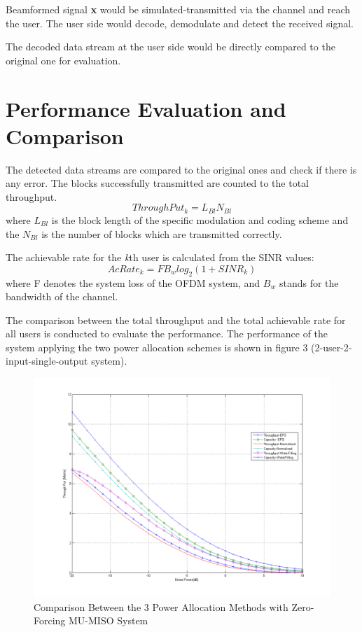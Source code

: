 \documentclass{article}
\begin{document}
\noindent
Beamformed signal \textbf{x} would be simulated-transmitted via the channel and reach the user.
The user side would decode, demodulate and detect the received signal.

\noindent
The decoded data stream at the user side would be directly compared to the original one for evaluation.


\section{Performance Evaluation and Comparison}
The detected data streams are compared to the original ones and check if there is any error. The blocks successfully transmitted are counted to the total throughput.
\[ThroughPut_k = L_{Bl}N_{Bl}\]
where $L_{Bl}$ is the block length of the specific modulation and coding scheme and the $N_{Bl}$ is the number of blocks which are transmitted correctly.

\noindent
The achievable rate for the \textit{k}th user is calculated from the SINR values:
$$AcRate_k = FB_wlog_2(1+SINR_k)$$
where F denotes the system loss of the OFDM system, and $B_w$ stands for the bandwidth of the channel.

\noindent
The comparison between the total throughput and the total achievable rate for all users is conducted to evaluate the performance.
The performance of the system applying the two power allocation schemes is shown in figure 3 (2-user-2-input-single-output system).


\begin{figure}[ht]
\centering
\includegraphics[scale=0.45]{Comparison.png}
\caption{Comparison Between the 3 Power Allocation Methods with Zero-Forcing MU-MISO System}
\label{fig:Comparison}
\end{figure}
\end{document}

